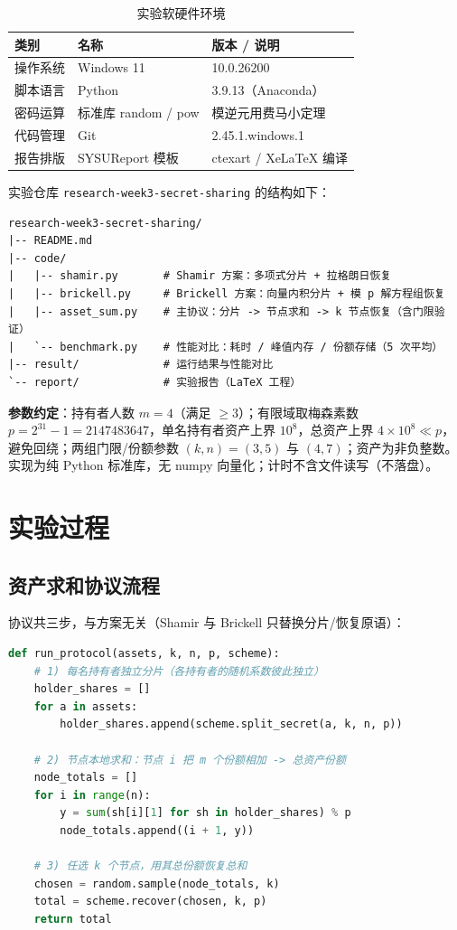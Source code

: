 \documentclass{SYSUReport}
\begin{document}
\begin{table}[htbp]
\centering
\caption{实验软硬件环境}
\label{tab:env}
\begin{tabular}{lll}
\toprule
\textbf{类别} & \textbf{名称} & \textbf{版本 / 说明} \\
\midrule
操作系统 & Windows 11 & 10.0.26200 \\
脚本语言 & Python & 3.9.13（Anaconda）\\
密码运算 & 标准库 random / pow & 模逆元用费马小定理 \\
代码管理 & Git & 2.45.1.windows.1 \\
报告排版 & SYSUReport 模板 & ctexart / XeLaTeX 编译 \\
\bottomrule
\end{tabular}
\end{table}

实验仓库 \texttt{research-week3-secret-sharing} 的结构如下：

\begin{lstlisting}[caption={实验仓库目录结构}]
research-week3-secret-sharing/
|-- README.md
|-- code/
|   |-- shamir.py       # Shamir 方案：多项式分片 + 拉格朗日恢复
|   |-- brickell.py     # Brickell 方案：向量内积分片 + 模 p 解方程组恢复
|   |-- asset_sum.py    # 主协议：分片 -> 节点求和 -> k 节点恢复（含门限验证）
|   `-- benchmark.py    # 性能对比：耗时 / 峰值内存 / 份额存储（5 次平均）
|-- result/             # 运行结果与性能对比
`-- report/             # 实验报告（LaTeX 工程）
\end{lstlisting}

\textbf{参数约定}：持有者人数 $m = 4$（满足 $\ge 3$）；有限域取梅森素数 $p = 2^{31} - 1 = 2147483647$，单名持有者资产上界 $10^8$，总资产上界 $4 \times 10^8 \ll p$，避免回绕；两组门限/份额参数 $(k,n) = (3,5)$ 与 $(4,7)$；资产为非负整数。实现为纯 Python 标准库，无 numpy 向量化；计时不含文件读写（不落盘）。

\section{实验过程}

\subsection{资产求和协议流程}

协议共三步，与方案无关（Shamir 与 Brickell 只替换分片/恢复原语）：

\begin{lstlisting}[language=Python, caption={资产求和协议主流程}]
def run_protocol(assets, k, n, p, scheme):
    # 1) 每名持有者独立分片（各持有者的随机系数彼此独立）
    holder_shares = []
    for a in assets:
        holder_shares.append(scheme.split_secret(a, k, n, p))

    # 2) 节点本地求和：节点 i 把 m 个份额相加 -> 总资产份额
    node_totals = []
    for i in range(n):
        y = sum(sh[i][1] for sh in holder_shares) % p
        node_totals.append((i + 1, y))

    # 3) 任选 k 个节点，用其总份额恢复总和
    chosen = random.sample(node_totals, k)
    total = scheme.recover(chosen, k, p)
    return total
\end{lstlisting}
\end{document}
